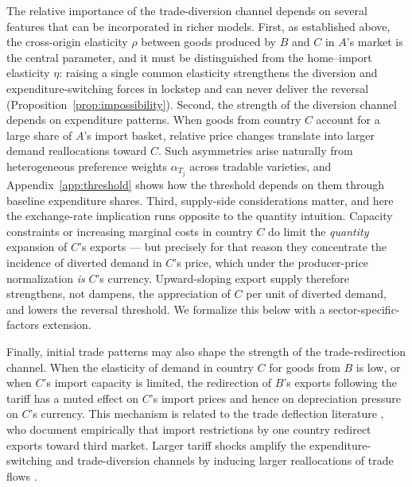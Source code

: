 \documentclass[11pt]{article}
\theoremstyle{plain}
\theoremstyle{remark}
\numberwithin{lemma}{section}
\numberwithin{proposition}{section}
\numberwithin{corollary}{section}
\newcommand{\rev}[1]{{\color{RevBlue}#1}}
\begin{document}
The relative importance of the trade-diversion channel depends on several features that can be incorporated in richer models. First, \rev{as established above, the cross-origin elasticity $\rho$ between goods produced by $B$ and $C$ in $A$'s market is the central parameter, and it must be distinguished from the home--import elasticity $\eta$: raising a single common elasticity strengthens the diversion and expenditure-switching forces in lockstep and can never deliver the reversal (Proposition~\ref{prop:impossibility})}. Second, the strength of the diversion channel depends on expenditure patterns. When goods from country $C$ account for a large share of $A$'s import basket, relative price changes translate into larger demand reallocations toward $C$. Such asymmetries arise naturally from heterogeneous preference weights $\alpha_{T_j}$ across tradable varieties\rev{, and Appendix~\ref{app:threshold} shows how the threshold depends on them through baseline expenditure shares}. Third, supply-side considerations matter\rev{, and here the exchange-rate implication runs opposite to the quantity intuition. Capacity constraints or increasing marginal costs in country $C$ do limit the \emph{quantity} expansion of $C$'s exports --- but precisely for that reason they concentrate the incidence of diverted demand in $C$'s price, which under the producer-price normalization \emph{is} $C$'s currency. Upward-sloping export supply therefore strengthens, not dampens, the appreciation of $C$ per unit of diverted demand, and lowers the reversal threshold. We formalize this below with a sector-specific-factors extension.}

Finally, initial trade patterns may also shape the strength of the trade-redirection channel. When the elasticity of demand in country $C$ for goods from $B$ is low, or when $C$'s import capacity is limited, the redirection of $B$'s exports following the tariff has a muted effect on $C$'s import prices and hence on depreciation pressure on $C$'s currency. This mechanism is related to the trade deflection literature \citep{bown2007}, who document empirically that import restrictions by one country redirect exports toward third market. Larger tariff shocks amplify the expenditure-switching and trade-diversion channels by inducing larger reallocations of trade flows \citep{amiti2019}.
\end{document}
